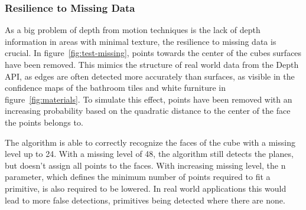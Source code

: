 \subsubsection{Resilience to Missing Data}

As a big problem of depth from motion techniques is the lack of depth information in areas with minimal texture,
the resilience to missing data is crucial.
In figure~\ref{fig:test-missing}, points towards the center of the cubes surfaces have been removed.
This mimics the structure of real world data from the Depth API,
as edges are often detected more accurately than surfaces,
as visible in the confidence maps of the bathroom tiles and white furniture in figure~\ref{fig:materials}.
To simulate this effect, points have been removed with an increasing probability based on the
quadratic distance to the center of the face the points belongs to.

The algorithm is able to correctly recognize the faces of the cube with a missing level up to 24.
With a missing level of 48, the algorithm still detects the planes, but doesn't assign all points to the faces.
With increasing missing level, the n parameter, which defines the minimum number of points required to fit a primitive,
is also required to be lowered.
In real world applications this would lead to more false detections, primitives being detected where there are none.

%
%


